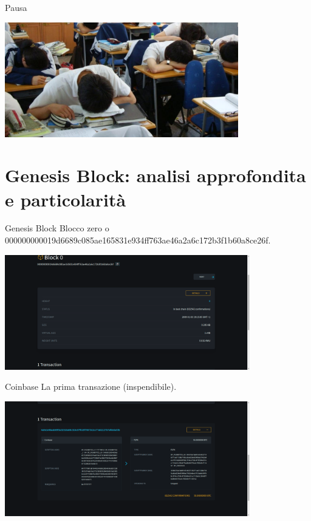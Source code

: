 \documentclass[aspectratio=169]{beamer}
\begin{document}
\begin{frame}{Pausa}
    \begin{center}
        \includegraphics[height=5cm]{pausa.jpg}
    \end{center}
\end{frame}

\section{Genesis Block: analisi approfondita e particolarità}

\begin{frame}{Genesis Block}
    Blocco zero o 000000000019d6689c085ae165831e934ff763ae46a2a6c172b3f1b60a8ce26f.
    \begin{center}
        \includegraphics[height=5cm]{primo_blocco.png}
    \end{center}
\end{frame}

\begin{frame}{Coinbase}
    La prima transazione (inspendibile).
    \begin{center}
        \includegraphics[height=5cm]{coinbase.png}
    \end{center}
\end{frame}
\end{document}
